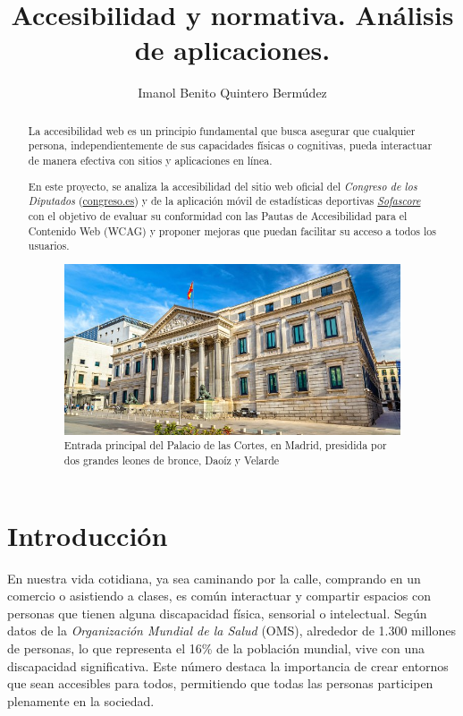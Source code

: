 \documentclass[]{article}
\title{Accesibilidad y normativa. Análisis de aplicaciones.}
\author{Imanol Benito Quintero Bermúdez}
\begin{document}
\maketitle

\begin{abstract}
	La accesibilidad web es un principio fundamental que busca asegurar que cualquier persona, independientemente de sus capacidades físicas o cognitivas, pueda interactuar de manera efectiva con sitios y aplicaciones en línea. 
	
	En este proyecto, se analiza la accesibilidad del sitio web oficial del \textit{Congreso de los Diputados} (\href{https://www.congreso.es/es/home}{congreso.es}) y de la aplicación móvil de estadísticas deportivas \textit{\href{https://play.google.com/store/apps/details?id=com.sofascore.results&pcampaignid=web_share}{Sofascore}} con el objetivo de evaluar su conformidad con las Pautas de Accesibilidad para el Contenido Web (WCAG) y proponer mejoras que puedan facilitar su acceso a todos los usuarios.
	
	\begin{figure}[h]
		\centering
		\includegraphics[width=\textwidth]{Capturas/5.png}
		\caption{Entrada principal del Palacio de las Cortes, en Madrid, presidida por dos grandes leones de bronce, Daoíz y Velarde}
		\label{fig:etiqueta}
	\end{figure}
\end{abstract}

\newpage  %

\tableofcontents  %

\newpage

\section{Introducción}
En nuestra vida cotidiana, ya sea caminando por la calle, comprando en un comercio o asistiendo a clases, es común interactuar y compartir espacios con personas que tienen alguna discapacidad física, sensorial o intelectual. Según datos de la \textit{Organización Mundial de la Salud} (OMS), alrededor de 1.300 millones de personas, lo que representa el 16\% de la población mundial, vive con una discapacidad significativa. Este número destaca la importancia de crear entornos que sean accesibles para todos, permitiendo que todas las personas participen plenamente en la sociedad.
\end{document}
